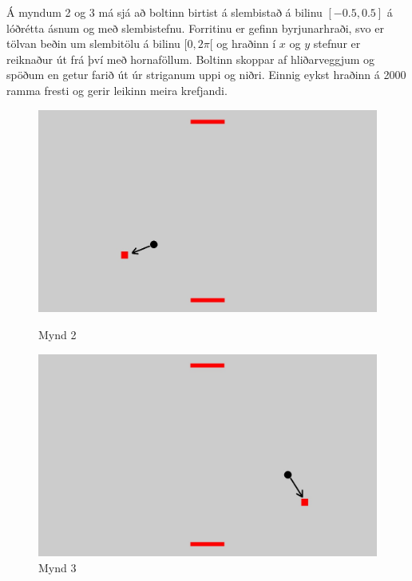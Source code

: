 \documentclass[12pt]{article}
\begin{document}
\begin{small}
Á myndum 2 og 3 má sjá að boltinn birtist á slembistað á bilinu $[-0.5,0.5]$ á lóðrétta ásnum og með slembistefnu. Forritinu er gefinn byrjunarhraði, svo er tölvan beðin um slembitölu á bilinu $[0,2\pi[$ og hraðinn í $x$ og $y$ stefnur er reiknaður út frá því með hornaföllum. Boltinn skoppar af hliðarveggjum og spöðum en getur farið út úr striganum uppi og niðri. Einnig eykst hraðinn á 2000 ramma fresti og gerir leikinn meira krefjandi.
\begin{figure}[h!]
	\centering
  	\includegraphics[scale=0.25]{1}
  	\caption{Mynd 2}
  	\includegraphics[scale=0.25]{2}
  	\caption{Mynd 3}
\end{figure}
\clearpage


\end{small}
\end{document}
